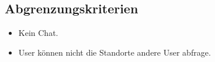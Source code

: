 \documentclass{scrartcl}
\begin{document}
	\subsection{Abgrenzungskriterien}
		\begin{itemize}
		\item Kein Chat.
		\item User können nicht die Standorte andere User abfrage.
		\end{itemize}
\end{document}
